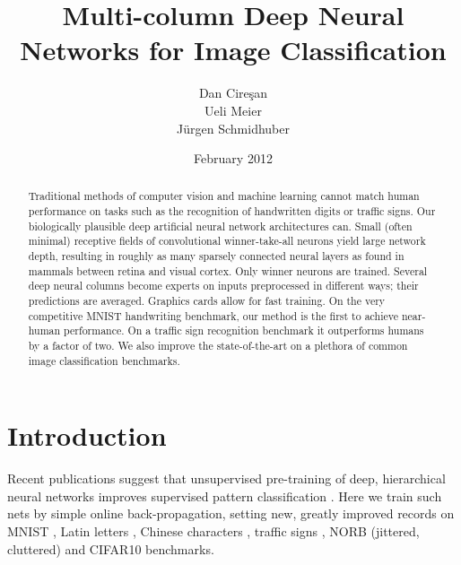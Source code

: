 \documentclass[a4paper]{article}
\title{Multi-column Deep Neural Networks for Image Classification}
\author{Dan Cire\c{s}an\\
  Ueli Meier\\
J{\"u}rgen Schmidhuber}
\date{February 2012}
\begin{document}
\makecover         \maketitle

\begin{abstract}
Traditional methods of computer vision and machine learning cannot match human performance on tasks such as the recognition of handwritten digits or traffic signs. Our biologically plausible deep artificial neural network architectures can.
Small (often minimal) receptive fields of convolutional winner-take-all neurons yield large network depth, resulting in roughly as many sparsely connected neural layers as found in mammals between retina and visual cortex. Only winner neurons are trained. Several deep neural columns become experts on inputs preprocessed in different ways; their predictions are averaged. Graphics cards allow for fast training. On the very competitive MNIST handwriting benchmark, our method is the first to achieve near-human performance. On a traffic sign recognition benchmark it outperforms humans by a factor of two. We also improve the state-of-the-art on a plethora of common image classification benchmarks.
\end{abstract}

\section{Introduction}

Recent publications suggest that unsupervised pre-training of deep, hierarchical neural networks improves supervised pattern classification  \cite{bengio:2007,erhan:2010}. Here we train such nets by simple online back-propagation, setting new, greatly improved records on MNIST \cite{lecun:1998}, Latin letters \cite{NIST}, Chinese characters \cite{cheng-lin:2010}, traffic signs \cite{stallkamp:2011}, NORB (jittered, cluttered) \cite{lecun:2004} and CIFAR10 \cite{krizhevsky:2009} benchmarks.
\end{document}
